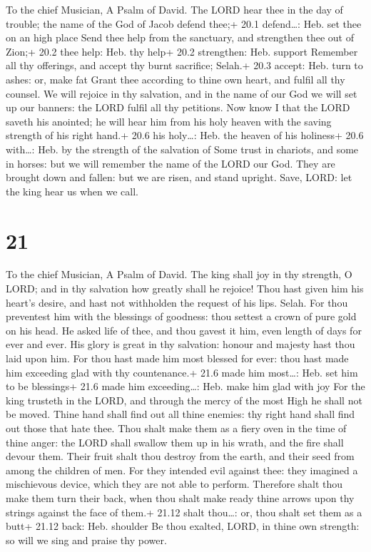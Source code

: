 To the chief Musician, A Psalm of David.  The LORD hear thee
in the day of trouble; the name of the God of Jacob defend thee;+ 20.1
defend\ldots: Heb. set thee on an high place  Send thee help
from the sanctuary, and strengthen thee out of Zion;+ 20.2 thee help:
Heb. thy help+ 20.2 strengthen: Heb. support  Remember all
thy offerings, and accept thy burnt sacrifice; Selah.+ 20.3 accept: Heb.
turn to ashes: or, make fat  Grant thee according to thine
own heart, and fulfil all thy counsel.  We will rejoice in
thy salvation, and in the name of our God we will set up our banners:
the LORD fulfil all thy petitions.  Now know I that the LORD
saveth his anointed; he will hear him from his holy heaven with the
saving strength of his right hand.+ 20.6 his holy\ldots: Heb. the heaven
of his holiness+ 20.6 with\ldots: Heb. by the strength of the salvation
of  Some trust in chariots, and some in horses: but we will
remember the name of the LORD our God.  They are brought
down and fallen: but we are risen, and stand upright.  Save,
LORD: let the king hear us when we call.

\hypertarget{section-20}{%
\section{21}\label{section-20}}

To the chief Musician, A Psalm of David.  The king shall joy
in thy strength, O LORD; and in thy salvation how greatly shall he
rejoice!  Thou hast given him his heart's desire, and hast
not withholden the request of his lips. Selah.  For thou
preventest him with the blessings of goodness: thou settest a crown of
pure gold on his head.  He asked life of thee, and thou
gavest it him, even length of days for ever and ever.  His
glory is great in thy salvation: honour and majesty hast thou laid upon
him.  For thou hast made him most blessed for ever: thou
hast made him exceeding glad with thy countenance.+ 21.6 made him
most\ldots: Heb. set him to be blessings+ 21.6 made him exceeding\ldots:
Heb. make him glad with joy  For the king trusteth in the
LORD, and through the mercy of the most High he shall not be moved.
 Thine hand shall find out all thine enemies: thy right hand
shall find out those that hate thee.  Thou shalt make them
as a fiery oven in the time of thine anger: the LORD shall swallow them
up in his wrath, and the fire shall devour them.  Their
fruit shalt thou destroy from the earth, and their seed from among the
children of men.  For they intended evil against thee: they
imagined a mischievous device, which they are not able to perform.
 Therefore shalt thou make them turn their back, when thou
shalt make ready thine arrows upon thy strings against the face of
them.+ 21.12 shalt thou\ldots: or, thou shalt set them as a butt+ 21.12
back: Heb. shoulder  Be thou exalted, LORD, in thine own
strength: so will we sing and praise thy power.

